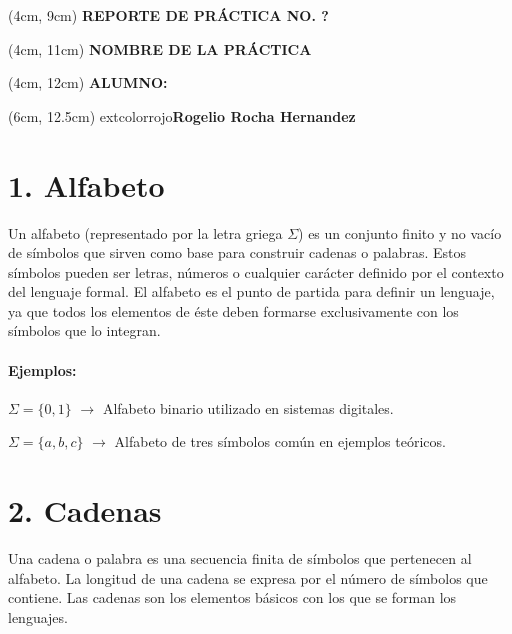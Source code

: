 \documentclass{article}
\begin{document}
\BgThispage
\-
\begin{textblock*}{15cm}(4cm, 9cm)
    {\fontsize{30pt}{16pt}\selectfont
    \textcolor{rojo}{\textbf{REPORTE DE PRÁCTICA NO. ?}}
    }
\end{textblock*}
\begin{textblock*}{15cm}(4cm, 11cm)
    {\fontsize{15pt}{16pt}\selectfont
    \textcolor{rojo}{\textbf{NOMBRE DE LA PRÁCTICA}}
    }
\end{textblock*}
\begin{textblock*}{15cm}(4cm, 12cm)
    {\fontsize{13pt}{16pt}\selectfont
    \textcolor{rojo}{\textbf{ALUMNO:}}
    }
\end{textblock*}
\begin{textblock*}{15cm}(6cm, 12.5cm)
  {\fontsize{11pt}{16pt}\selectfont
  	extcolor{rojo}{\textbf{Rogelio Rocha Hernandez}}
  }
\end{textblock*}

\newpage

\section{1. Alfabeto}

Un alfabeto (representado por la letra griega $\Sigma$) es un conjunto finito y no vacío de símbolos que sirven como base para construir cadenas o palabras.
Estos símbolos pueden ser letras, números o cualquier carácter definido por el contexto del lenguaje formal.
El alfabeto es el punto de partida para definir un lenguaje, ya que todos los elementos de éste deben formarse exclusivamente con los símbolos que lo integran.

\paragraph{Ejemplos:}

$\Sigma = \{0,1\}$ \(\to\) Alfabeto binario utilizado en sistemas digitales.

$\Sigma = \{a, b, c\}$ \(\to\) Alfabeto de tres símbolos común en ejemplos teóricos.

\section{2. Cadenas}

Una cadena o palabra es una secuencia finita de símbolos que pertenecen al alfabeto.
La longitud de una cadena se expresa por el número de símbolos que contiene.
Las cadenas son los elementos básicos con los que se forman los lenguajes.
\end{document}

